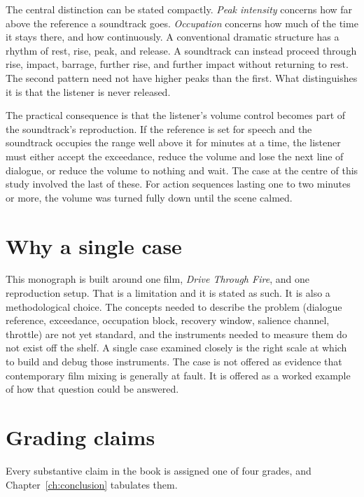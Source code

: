The central distinction can be stated compactly. \emph{Peak intensity} concerns how far above the reference a soundtrack goes. \emph{Occupation} concerns how much of the time it stays there, and how continuously. A conventional dramatic structure has a rhythm of rest, rise, peak, and release. A soundtrack can instead proceed through rise, impact, barrage, further rise, and further impact without returning to rest. The second pattern need not have higher peaks than the first. What distinguishes it is that the listener is never released.

The practical consequence is that the listener's volume control becomes part of the soundtrack's reproduction. If the reference is set for speech and the soundtrack occupies the range well above it for minutes at a time, the listener must either accept the exceedance, reduce the volume and lose the next line of dialogue, or reduce the volume to nothing and wait. The case at the centre of this study involved the last of these. For action sequences lasting one to two minutes or more, the volume was turned fully down until the scene calmed.

\section{Why a single case}

This monograph is built around one film, \emph{Drive Through Fire}, and one reproduction setup. That is a limitation and it is stated as such. It is also a methodological choice. The concepts needed to describe the problem (dialogue reference, exceedance, occupation block, recovery window, salience channel, throttle) are not yet standard, and the instruments needed to measure them do not exist off the shelf. A single case examined closely is the right scale at which to build and debug those instruments. The case is not offered as evidence that contemporary film mixing is generally at fault. It is offered as a worked example of how that question could be answered.

\section{Grading claims}

Every substantive claim in the book is assigned one of four grades, and Chapter~\ref{ch:conclusion} tabulates them.


